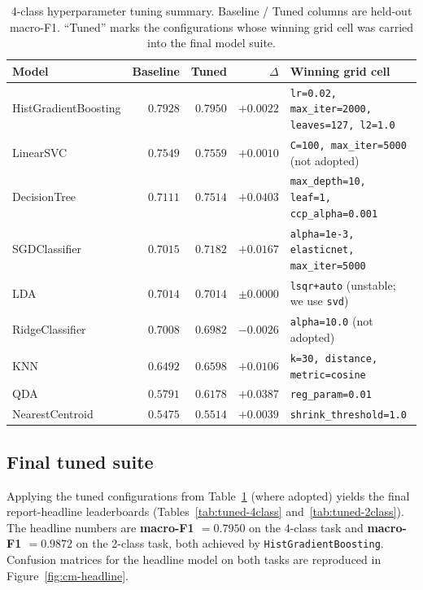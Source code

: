 \documentclass[11pt,a4paper]{article}
\begin{document}
\begin{table}[H]
\centering
\caption{4-class hyperparameter tuning summary. Baseline / Tuned columns are
held-out macro-F1. ``Tuned'' marks the configurations whose winning grid cell
was carried into the final model suite.}
\label{tab:tuning}
\small
\begin{tabular}{lrrrl}
\toprule
Model & Baseline & Tuned & $\Delta$ & Winning grid cell \\
\midrule
HistGradientBoosting & $0.7928$ & $0.7950$ & $+0.0022$ & \texttt{lr=0.02, max\_iter=2000, leaves=127, l2=1.0} \\
LinearSVC & $0.7549$ & $0.7559$ & $+0.0010$ & \texttt{C=100, max\_iter=5000} (not adopted) \\
DecisionTree & $0.7111$ & $0.7514$ & $+0.0403$ & \texttt{max\_depth=10, leaf=1, ccp\_alpha=0.001} \\
SGDClassifier & $0.7015$ & $0.7182$ & $+0.0167$ & \texttt{alpha=1e-3, elasticnet, max\_iter=5000} \\
LDA & $0.7014$ & $0.7014$ & $\pm 0.0000$ & \texttt{lsqr+auto} (unstable; we use \texttt{svd}) \\
RidgeClassifier & $0.7008$ & $0.6982$ & $-0.0026$ & \texttt{alpha=10.0} (not adopted) \\
KNN & $0.6492$ & $0.6598$ & $+0.0106$ & \texttt{k=30, distance, metric=cosine} \\
QDA & $0.5791$ & $0.6178$ & $+0.0387$ & \texttt{reg\_param=0.01} \\
NearestCentroid & $0.5475$ & $0.5514$ & $+0.0039$ & \texttt{shrink\_threshold=1.0} \\
\bottomrule
\end{tabular}
\end{table}

\subsection{Final tuned suite}
\label{sec:tuned-final}

Applying the tuned configurations from Table~\ref{tab:tuning} (where adopted)
yields the final
report-headline leaderboards (Tables~\ref{tab:tuned-4class}
and~\ref{tab:tuned-2class}). The headline numbers are
\textbf{macro-F1 $=0.7950$} on the 4-class task and
\textbf{macro-F1 $=0.9872$} on the 2-class task, both achieved by
\texttt{HistGradientBoosting}. Confusion matrices for the headline model
on both tasks are reproduced in Figure~\ref{fig:cm-headline}.
\end{document}
